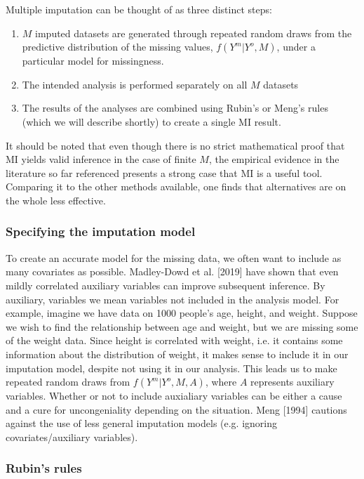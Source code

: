 \documentclass{article}
\begin{document}
	Multiple imputation can be thought of as three distinct steps:
	\begin{enumerate}
		\item $M$ imputed datasets are generated through repeated random draws from the predictive distribution of the missing values, $f(Y^{m}|Y^{o}, M)$, under a particular model for missingness.
		\item The intended analysis is performed separately on all $M$ datasets
		\item The results of the analyses are combined using Rubin's or Meng's rules (which we will describe shortly) to create a single MI result.
	\end{enumerate}
	It should be noted that even though there is no strict mathematical proof that MI yields valid inference in the case of finite $M$, the empirical evidence in the literature so far referenced presents a strong case that MI is a useful tool. Comparing it to the other methods available, one finds that alternatives are on the whole less effective.
	
	\subsubsection{Specifying the imputation model}
	
	To create an accurate model for the missing data, we often want to include as many covariates as possible. Madley-Dowd et al. [2019] have shown that even mildly correlated auxiliary variables can improve subsequent inference. By auxiliary, variables we mean variables not included in the analysis model. For example, imagine we have data on 1000 people's age, height, and weight. Suppose we wish to find the relationship between age and weight, but we are missing some of the weight data. Since height is correlated with weight, i.e. it contains some information about the distribution of weight, it makes sense to include it in our imputation model, despite not using it in our analysis. This leads us to make repeated random draws from $f(Y^{m}|Y^{o}, M, A)$, where $A$ represents auxiliary variables. Whether or not to include auxialiary variables can be either a cause and a cure for uncongeniality depending on the situation. Meng [1994] cautions against the use of less general imputation models (e.g. ignoring covariates/auxiliary variables).
	
	\subsubsection{Rubin's rules}
	
\end{document}
